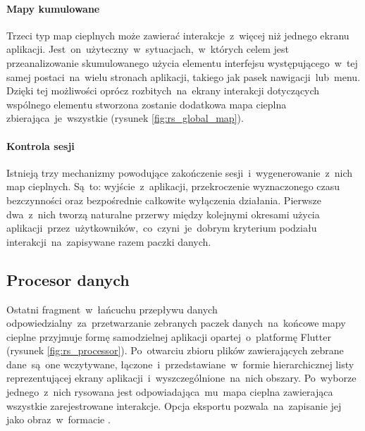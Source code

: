 \bigskip
{}

\paragraph{Mapy kumulowane} Trzeci typ map cieplnych może zawierać interakcje~z~więcej niż jednego ekranu aplikacji. Jest~on~użyteczny~w~sytuacjach,~w~których celem jest przeanalizowanie skumulowanego użycia elementu interfejsu występującego~w~tej samej postaci~na~wielu stronach aplikacji, takiego jak pasek nawigacji~lub~menu. Dzięki tej możliwości oprócz rozbitych~na~ekrany interakcji dotyczących wspólnego elementu stworzona zostanie dodatkowa mapa cieplna zbierająca~je~wszystkie (rysunek \ref{fig:rs_global_map}).

\bigskip
{}

\paragraph{Kontrola sesji}
Istnieją trzy mechanizmy powodujące zakończenie sesji~i~wygenerowanie~z~nich map cieplnych. Są~to: wyjście~z~aplikacji, przekroczenie wyznaczonego czasu bezczynności oraz bezpośrednie całkowite wyłączenia działania. Pierwsze dwa~z~nich tworzą naturalne przerwy między kolejnymi okresami użycia aplikacji~przez~użytkowników,~co~czyni~je~dobrym kryterium podziału interakcji~na~zapisywane razem paczki danych.

\newcommand*\circled[1]{\tikz[baseline=(char.base)]{\node[shape=circle,draw,inner sep=1.2pt] (char) {#1};}}

\subsection{Procesor danych}
Ostatni fragment~w~łańcuchu przepływu danych odpowiedzialny~za~przetwarzanie zebranych paczek danych~na~końcowe mapy cieplne przyjmuje formę samodzielnej aplikacji opartej~o~platformę Flutter (rysunek \ref{fig:rs_processor}). Po~otwarciu zbioru plików zawierających zebrane dane~są~one wczytywane, łączone~i~przedstawiane~w~formie hierarchicznej listy reprezentującej ekrany aplikacji~i~wyszczególnione~na~nich obszary. Po~wyborze jednego~z~nich rysowana jest odpowiadająca~mu~mapa cieplna zawierająca wszystkie zarejestrowane interakcje. Opcja eksportu pozwala~na~zapisanie jej jako obraz~w~formacie .


